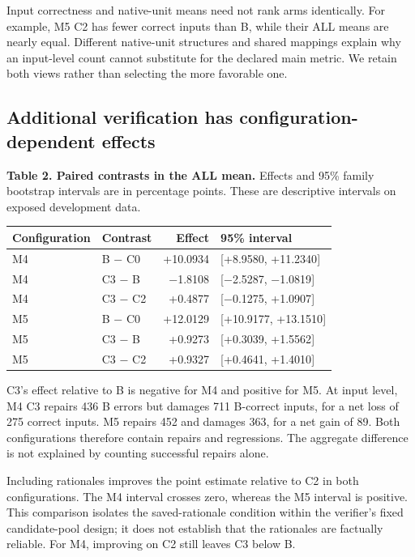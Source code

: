 \documentclass[
  english,
  11pt,
]{article}
\newcounter{none} %
\begin{document}
Input correctness and native-unit means need not rank arms identically.
For example, M5 C2 has fewer correct inputs than B, while their ALL
means are nearly equal. Different native-unit structures and shared
mappings explain why an input-level count cannot substitute for the
declared main metric. We retain both views rather than selecting the
more favorable one.

\subsection{Additional verification has configuration-dependent
effects}\label{additional-verification-has-configuration-dependent-effects}

\textbf{Table 2. Paired contrasts in the ALL mean.} Effects and 95\%
family bootstrap intervals are in percentage points. These are
descriptive intervals on exposed development data.

{\def\LTcaptype{none} %
\begin{longtable}[]{@{}llrl@{}}
\toprule\noalign{}
Configuration & Contrast & Effect & 95\% interval \\
\midrule\noalign{}
\endhead
\bottomrule\noalign{}
\endlastfoot
M4 & B − C0 & +10.0934 & {[}+8.9580, +11.2340{]} \\
M4 & C3 − B & −1.8108 & {[}−2.5287, −1.0819{]} \\
M4 & C3 − C2 & +0.4877 & {[}−0.1275, +1.0907{]} \\
M5 & B − C0 & +12.0129 & {[}+10.9177, +13.1510{]} \\
M5 & C3 − B & +0.9273 & {[}+0.3039, +1.5562{]} \\
M5 & C3 − C2 & +0.9327 & {[}+0.4641, +1.4010{]} \\
\end{longtable}
}

C3's effect relative to B is negative for M4 and positive for M5. At
input level, M4 C3 repairs 436 B errors but damages 711 B-correct
inputs, for a net loss of 275 correct inputs. M5 repairs 452 and damages
363, for a net gain of 89. Both configurations therefore contain repairs
and regressions. The aggregate difference is not explained by counting
successful repairs alone.

Including rationales improves the point estimate relative to C2 in both
configurations. The M4 interval crosses zero, whereas the M5 interval is
positive. This comparison isolates the saved-rationale condition within
the verifier's fixed candidate-pool design; it does not establish that
the rationales are factually reliable. For M4, improving on C2 still
leaves C3 below B.
\end{document}
